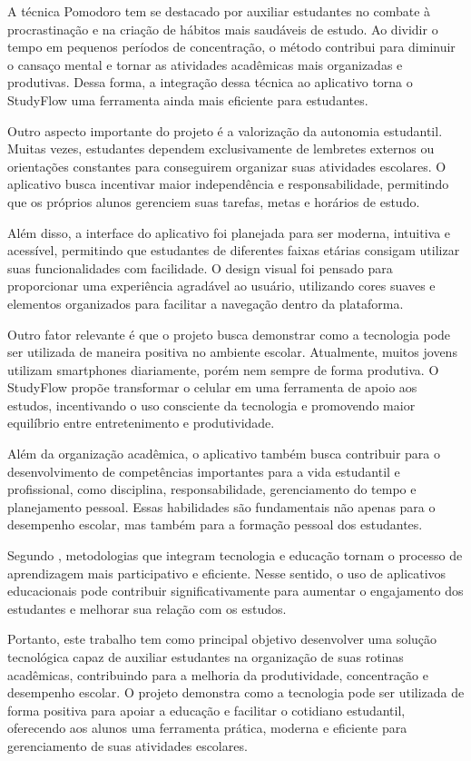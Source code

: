 \documentclass[12pt]{article}
\begin{document}
A técnica Pomodoro tem se destacado por auxiliar estudantes no combate à procrastinação e na criação de hábitos mais saudáveis de estudo. Ao dividir o tempo em pequenos períodos de concentração, o método contribui para diminuir o cansaço mental e tornar as atividades acadêmicas mais organizadas e produtivas. Dessa forma, a integração dessa técnica ao aplicativo torna o StudyFlow uma ferramenta ainda mais eficiente para estudantes.

Outro aspecto importante do projeto é a valorização da autonomia estudantil. Muitas vezes, estudantes dependem exclusivamente de lembretes externos ou orientações constantes para conseguirem organizar suas atividades escolares. O aplicativo busca incentivar maior independência e responsabilidade, permitindo que os próprios alunos gerenciem suas tarefas, metas e horários de estudo.

Além disso, a interface do aplicativo foi planejada para ser moderna, intuitiva e acessível, permitindo que estudantes de diferentes faixas etárias consigam utilizar suas funcionalidades com facilidade. O design visual foi pensado para proporcionar uma experiência agradável ao usuário, utilizando cores suaves e elementos organizados para facilitar a navegação dentro da plataforma.

Outro fator relevante é que o projeto busca demonstrar como a tecnologia pode ser utilizada de maneira positiva no ambiente escolar. Atualmente, muitos jovens utilizam smartphones diariamente, porém nem sempre de forma produtiva. O StudyFlow propõe transformar o celular em uma ferramenta de apoio aos estudos, incentivando o uso consciente da tecnologia e promovendo maior equilíbrio entre entretenimento e produtividade.

Além da organização acadêmica, o aplicativo também busca contribuir para o desenvolvimento de competências importantes para a vida estudantil e profissional, como disciplina, responsabilidade, gerenciamento do tempo e planejamento pessoal. Essas habilidades são fundamentais não apenas para o desempenho escolar, mas também para a formação pessoal dos estudantes.

Segundo , metodologias que integram tecnologia e educação tornam o processo de aprendizagem mais participativo e eficiente. Nesse sentido, o uso de aplicativos educacionais pode contribuir significativamente para aumentar o engajamento dos estudantes e melhorar sua relação com os estudos.

Portanto, este trabalho tem como principal objetivo desenvolver uma solução tecnológica capaz de auxiliar estudantes na organização de suas rotinas acadêmicas, contribuindo para a melhoria da produtividade, concentração e desempenho escolar. O projeto demonstra como a tecnologia pode ser utilizada de forma positiva para apoiar a educação e facilitar o cotidiano estudantil, oferecendo aos alunos uma ferramenta prática, moderna e eficiente para gerenciamento de suas atividades escolares.
\end{document}
